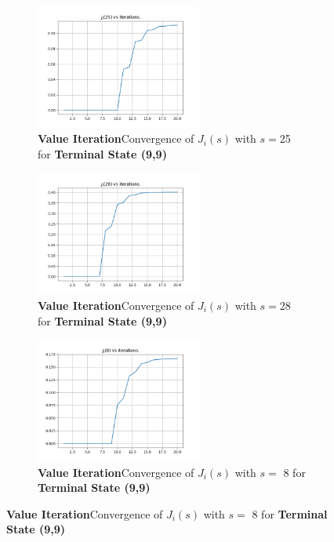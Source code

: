 \begin{figure}[h]
\begin{subfigure}
\centering
\includegraphics[angle=0,width=0.6\textwidth]{hw4/logs/value_iter_t=99_N=20/convergence-till-20-state-25.png}
\caption{ \textbf{Value Iteration}Convergence of $J_i(s)$ with $s =$25 for \textbf{Terminal State (9,9)}}
\end{subfigure}

\begin{subfigure}
\centering
\includegraphics[angle=0,width=0.6\textwidth]{hw4/logs/value_iter_t=99_N=20/convergence-till-20-state-28.png}
\caption{ \textbf{Value Iteration}Convergence of $J_i(s)$ with $s =$28 for \textbf{Terminal State (9,9)}}
\end{subfigure}

\begin{subfigure}
\centering
\includegraphics[angle=0,width=0.6\textwidth]{hw4/logs/value_iter_t=99_N=20/convergence-till-20-state-8.png}
\caption{ \textbf{Value Iteration}Convergence of $J_i(s)$ with $s =$ 8 for \textbf{Terminal State (9,9)}}
\end{subfigure}
\end{figure}


